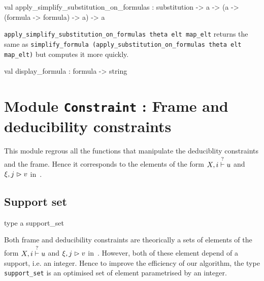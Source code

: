 \label{val:Recipe.apply-underscoresimplify-underscoresubstitution-underscoreon-underscoreformulas}\begin{ocamldoccode}
val apply_simplify_substitution_on_formulas :
  substitution ->
  {\textquotesingle}a -> ({\textquotesingle}a -> (formula -> formula) -> {\textquotesingle}a) -> {\textquotesingle}a
\end{ocamldoccode}
\begin{ocamldocdescription}
{\tt{apply\_simplify\_substitution\_on\_formulas theta elt map\_elt}} returns the same as {\tt{simplify\_formula (apply\_substitution\_on\_formulas theta elt map\_elt)}}
    but computes it more quickly.


\end{ocamldocdescription}




\label{val:Recipe.display-underscoreformula}\begin{ocamldoccode}
val display_formula : formula -> string
\end{ocamldoccode}


\section{Module {\tt{Constraint}} : Frame and deducibility constraints}
\label{module:Constraint}




\ocamldocvspace{0.5cm}



This module regrous all the functions that manipulate the deduciblity constraints and the frame.
    Hence it corresponds to the elements of the form $X, i \stackrel{?}{\vdash} u$ and $\xi, j \vartriangleright v$ in~. 



\subsection{Support set}




\label{type:Constraint.support-underscoreset}\begin{ocamldoccode}
type {\textquotesingle}a support_set 
\end{ocamldoccode}
\begin{ocamldocdescription}
Both frame and deducibility constraints are theorically a sets of elements of the form $X, i \stackrel{?}{\vdash} u$ and $\xi, j \vartriangleright v$
    in~\thesis.  However, both of these element depend of a support, i.e. an integer. Hence to improve the 
    efficiency of our algorithm, the type {\tt{support\_set}} is an optimised set of element parametrised by an integer.


\end{ocamldocdescription}




